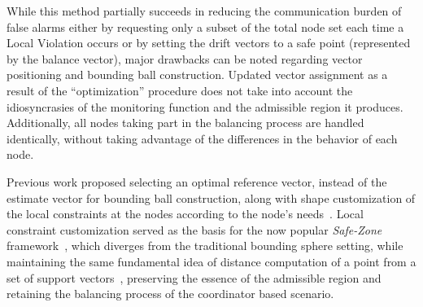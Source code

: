 While this method partially succeeds in reducing the communication burden of false alarms either by requesting only a subset of the total node set each time a Local Violation occurs or by setting the drift vectors to a safe point (represented by the balance vector), major drawbacks can be noted regarding vector positioning and bounding ball construction. Updated vector assignment as a result of the ``optimization'' procedure does not take into account the idiosyncrasies of the monitoring function and the admissible region it produces. Additionally, all nodes taking part in the balancing process are handled identically, without taking advantage of the differences in the behavior of each node.

Previous work proposed selecting an optimal reference vector, instead of the estimate vector for bounding ball construction, along with shape customization of the local constraints at the nodes according to the node's needs~\cite{Sharfman2012ShapeSensGM}. Local constraint customization served as the basis for the now popular \emph{Safe-Zone} framework~\cite{Keren2013SafeZones, Keren2014GMHetStreams}, which diverges from the traditional bounding sphere setting, while maintaining the same fundamental idea of distance computation of a point from a set of support vectors~\cite{Samoladas2013Unification}, preserving the essence of the admissible region and retaining the balancing process of the coordinator based scenario.


